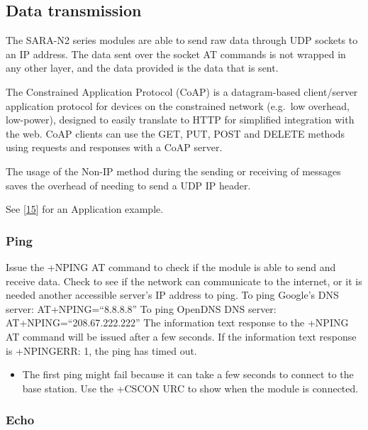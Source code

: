 \documentclass[]{article}
\providecommand{\tightlist}{%
  \setlength{\itemsep}{0pt}\setlength{\parskip}{0pt}}
\begin{document}
\hypertarget{data-transmission}{%
\subsection{Data transmission}\label{data-transmission}}

The SARA-N2 series modules are able to send raw data through UDP sockets
to an IP address. The data sent over the socket AT commands is not
wrapped in any other layer, and the data provided is the data that is
sent.

The Constrained Application Protocol (CoAP) is a datagram-based
client/server application protocol for devices on the constrained
network (e.g.~low overhead, low-power), designed to easily translate to
HTTP for simplified integration with the web. CoAP clients can use the
GET, PUT, POST and DELETE methods using requests and responses with a
CoAP server.

The usage of the Non-IP method during the sending or receiving of
messages saves the overhead of needing to send a UDP IP header.

See {[}\protect\hyperlink{ref-ubloxAppNote2018}{15}{]} for an
Application example.

\hypertarget{ping}{%
\subsubsection{Ping}\label{ping}}

Issue the +NPING AT command to check if the module is able to send and
receive data. Check to see if the network can communicate to the
internet, or it is needed another accessible server's IP address to
ping. To ping Google's DNS server: AT+NPING=``8.8.8.8'' To ping OpenDNS
DNS server: AT+NPING=``208.67.222.222'' The information text response to
the +NPING AT command will be issued after a few seconds. If the
information text response is +NPINGERR: 1, the ping has timed out.

\begin{itemize}
\tightlist
\item
  The first ping might fail because it can take a few seconds to connect
  to the base station. Use the +CSCON URC to show when the module is
  connected.
\end{itemize}

\hypertarget{echo}{%
\subsubsection{Echo}\label{echo}}
\end{document}
